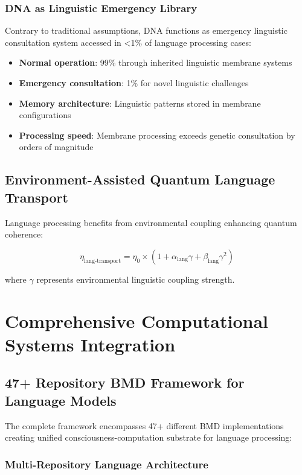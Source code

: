 \documentclass[12pt,a4paper]{article}
\begin{document}
\subsubsection{DNA as Linguistic Emergency Library}

Contrary to traditional assumptions, DNA functions as emergency linguistic consultation system accessed in <1\% of language processing cases:

\begin{itemize}
\item \textbf{Normal operation}: 99\% through inherited linguistic membrane systems
\item \textbf{Emergency consultation}: 1\% for novel linguistic challenges
\item \textbf{Memory architecture}: Linguistic patterns stored in membrane configurations
\item \textbf{Processing speed}: Membrane processing exceeds genetic consultation by orders of magnitude
\end{itemize}

\subsection{Environment-Assisted Quantum Language Transport}

Language processing benefits from environmental coupling enhancing quantum coherence:

\begin{equation}
\eta_{\text{lang-transport}} = \eta_0 \times (1 + \alpha_{\text{lang}}\gamma + \beta_{\text{lang}}\gamma^2)
\end{equation}

where $\gamma$ represents environmental linguistic coupling strength.

\section{Comprehensive Computational Systems Integration}

\subsection{47+ Repository BMD Framework for Language Models}

The complete framework encompasses 47+ different BMD implementations creating unified consciousness-computation substrate for language processing:

\subsubsection{Multi-Repository Language Architecture}
\end{document}
